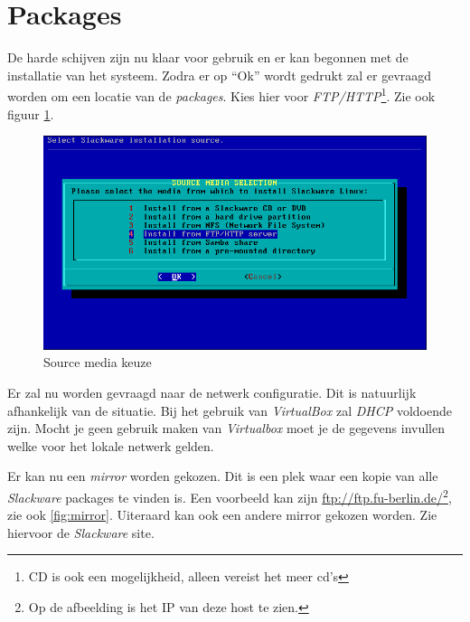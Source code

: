 \section{Packages}
De harde schijven zijn nu klaar voor gebruik en er kan begonnen met de installatie van het systeem. Zodra er op ``Ok'' wordt gedrukt zal er gevraagd worden om een locatie van de \emph{packages}. Kies hier voor \emph{FTP/HTTP}\footnote{CD is ook een mogelijkheid, alleen vereist het meer cd's}. Zie ook figuur \ref{fig:source}. 

\begin{figure}[H]
  \begin{center}
    \includegraphics[scale=0.5]{images/04_source_media}
  \end{center}
  \caption{Source media keuze}
  \label{fig:source}
\end{figure}

Er zal nu worden gevraagd naar de netwerk configuratie. Dit is natuurlijk afhankelijk van de situatie. Bij het gebruik van \emph{VirtualBox} zal \emph{DHCP} voldoende zijn. Mocht je geen gebruik maken van \emph{Virtualbox} moet je de gegevens invullen welke voor het lokale netwerk gelden.

Er kan nu een \emph{mirror} worden gekozen. Dit is een plek waar een kopie van alle \emph{Slackware} packages te vinden is. Een voorbeeld kan zijn \url{ftp://ftp.fu-berlin.de/}\footnote{Op de afbeelding is het IP van deze host te zien.}, zie ook \ref{fig:mirror}. Uiteraard kan ook een andere mirror gekozen worden. Zie hiervoor de \emph{Slackware} site.

